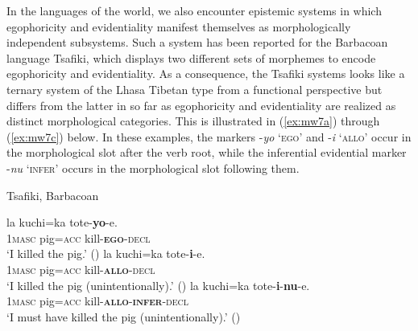 \documentclass[output=paper]{langsci/langscibook}
\begin{document}
In the languages of the world, we also encounter epistemic systems in which egophoricity and evidentiality manifest themselves as morphologically independent subsystems. Such a system has been reported for the Barbacoan language Tsafiki, which displays two different sets of morphemes to encode egophoricity and evidentiality. As a consequence, the Tsafiki systems looks like a ternary system of the Lhasa Tibetan type from a functional perspective but differs from the latter in so far as egophoricity and evidentiality are realized as distinct morphological categories. This is illustrated in (\ref{ex:mw7a}) through (\ref{ex:mw7c}) below. In these examples, the markers -\textit{yo} ‘\textsc{ego}’ and -\textit{i} ‘\textsc{allo}’ occur in the morphological slot after the verb root, while the inferential evidential marker -\textit{nu} ‘\textsc{infer}’ occurs in the morphological slot following them.

\begin{exe}
	\ex Tsafiki, Barbacoan\label{ex:mw7}
	\begin{xlist}
	\ex \label{ex:mw7a}
	\gll la kuchi=ka tote-\textbf{yo}-e.\\
	1\textsc{masc} pig=\textsc{acc} kill-\textbf{\textsc{ego}}-\textsc{decl}\\
	\trans ‘I killed the pig.’ (\citealt[412]{Dickinson2000})
	\ex \label{ex:mw7b}
	\gll la kuchi=ka tote-\textbf{i}-e.\\
	1\textsc{masc} pig=\textsc{acc} kill-\textbf{\textsc{allo}}-\textsc{decl}\\
	\trans ‘I killed the pig (unintentionally).’ (\citealt[412]{Dickinson2000})
	\ex	\label{ex:mw7c}
	\gll la kuchi=ka tote-\textbf{i}-\textbf{nu}-e.\\
	1\textsc{masc} pig=\textsc{acc} kill-\textbf{\textsc{allo}}-\textbf{\textsc{infer}}-\textsc{decl}\\
	\trans ‘I must have killed the pig (unintentionally).’ (\citealt[412]{Dickinson2000})
	\end{xlist}
\end{exe}
\end{document}
